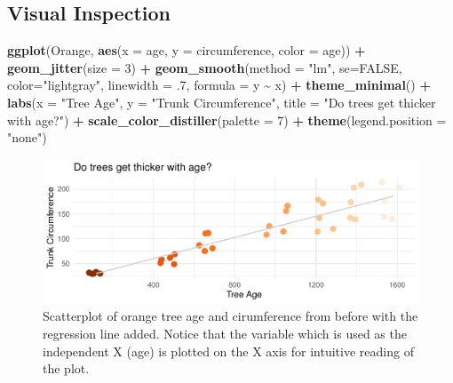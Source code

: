 \documentclass[
]{book}
\newenvironment{Shaded}{\begin{snugshade}}{\end{snugshade}}
\newcommand{\AttributeTok}[1]{\textcolor[rgb]{0.13,0.29,0.53}{#1}}
\newcommand{\ConstantTok}[1]{\textcolor[rgb]{0.56,0.35,0.01}{#1}}
\newcommand{\DecValTok}[1]{\textcolor[rgb]{0.00,0.00,0.81}{#1}}
\newcommand{\FunctionTok}[1]{\textcolor[rgb]{0.13,0.29,0.53}{\textbf{#1}}}
\newcommand{\NormalTok}[1]{#1}
\newcommand{\SpecialCharTok}[1]{\textcolor[rgb]{0.81,0.36,0.00}{\textbf{#1}}}
\newcommand{\StringTok}[1]{\textcolor[rgb]{0.31,0.60,0.02}{#1}}
\begin{document}
\subsection{Visual Inspection}\label{visual-inspection}

\begin{Shaded}
\begin{Highlighting}[]
\FunctionTok{ggplot}\NormalTok{(Orange, }\FunctionTok{aes}\NormalTok{(}\AttributeTok{x =}\NormalTok{ age, }\AttributeTok{y =}\NormalTok{ circumference, }\AttributeTok{color =}\NormalTok{ age)) }\SpecialCharTok{+} \FunctionTok{geom\_jitter}\NormalTok{(}\AttributeTok{size =} \DecValTok{3}\NormalTok{) }\SpecialCharTok{+}
  \FunctionTok{geom\_smooth}\NormalTok{(}\AttributeTok{method =} \StringTok{"lm"}\NormalTok{, }\AttributeTok{se=}\ConstantTok{FALSE}\NormalTok{, }\AttributeTok{color=}\StringTok{"lightgray"}\NormalTok{, }
              \AttributeTok{linewidth =}\NormalTok{ .}\DecValTok{7}\NormalTok{, }\AttributeTok{formula =}\NormalTok{ y }\SpecialCharTok{\textasciitilde{}}\NormalTok{ x) }\SpecialCharTok{+} 
  \FunctionTok{theme\_minimal}\NormalTok{() }\SpecialCharTok{+} 
  \FunctionTok{labs}\NormalTok{(}\AttributeTok{x =} \StringTok{"Tree Age"}\NormalTok{, }\AttributeTok{y =} \StringTok{"Trunk Circumference"}\NormalTok{, }\AttributeTok{title =} \StringTok{"Do trees get thicker with age?"}\NormalTok{) }\SpecialCharTok{+} 
  \FunctionTok{scale\_color\_distiller}\NormalTok{(}\AttributeTok{palette =} \DecValTok{7}\NormalTok{) }\SpecialCharTok{+} 
  \FunctionTok{theme}\NormalTok{(}\AttributeTok{legend.position =} \StringTok{"none"}\NormalTok{)}
\end{Highlighting}
\end{Shaded}

\begin{figure}
\centering
\includegraphics{_main_files/figure-html/tree-age-elaborate-1.pdf}
\caption{\label{fig:tree-age-elaborate}Scatterplot of orange tree age and cirumference from before with the regression line added. Notice that the variable which is used as the independent X (age) is plotted on the X axis for intuitive reading of the plot.}
\end{figure}
\end{document}

